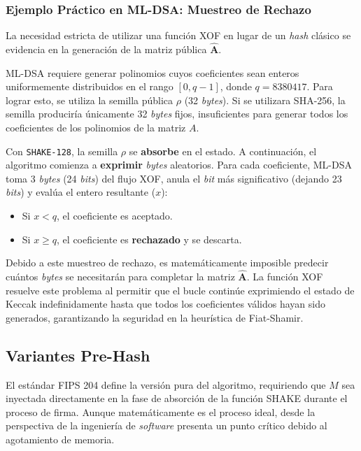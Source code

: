 \documentclass[11pt, a4paper]{report}
\theoremstyle{definition}
\begin{document}
\subsubsection{Ejemplo Práctico en ML-DSA: Muestreo de Rechazo}

La necesidad estricta de utilizar una función XOF en lugar de un \textit{hash} clásico se evidencia en la generación de la matriz pública $\mathbf{\hat{A}}$. 

ML-DSA requiere generar polinomios cuyos coeficientes sean enteros uniformemente distribuidos en el rango $[0, q-1]$, donde $q = 8380417$. Para lograr esto, se utiliza la semilla pública $\rho$ (32 \textit{bytes}). Si se utilizara SHA-256, la semilla produciría únicamente 32 \textit{bytes} fijos, insuficientes para generar todos los coeficientes de los polinomios de la matriz $A$.

Con \texttt{SHAKE-128}, la semilla $\rho$ se \textbf{absorbe} en el estado. A continuación, el algoritmo comienza a \textbf{exprimir} \textit{bytes} aleatorios. Para cada coeficiente, ML-DSA toma 3 \textit{bytes} (24 \textit{bits}) del flujo XOF, anula el \textit{bit} más significativo (dejando 23 \textit{bits}) y evalúa el entero resultante ($x$):
\begin{itemize}
    \item Si $x < q$, el coeficiente es aceptado.
    \item Si $x \ge q$, el coeficiente es \textbf{rechazado} y se descarta.
\end{itemize}
Debido a este muestreo de rechazo, es matemáticamente imposible predecir cuántos \textit{bytes} se necesitarán para completar la matriz $\mathbf{\hat{A}}$. La función XOF resuelve este problema al permitir que el bucle continúe exprimiendo el estado de Keccak indefinidamente hasta que todos los coeficientes válidos hayan sido generados, garantizando la seguridad en la heurística de Fiat-Shamir.

\subsection{Variantes Pre-Hash}
\label{subsec:prehash_oids}

El estándar FIPS 204 define la versión pura del algoritmo, requiriendo que $M$ sea inyectada directamente en la fase de absorción de la función SHAKE durante el proceso de firma. Aunque matemáticamente es el proceso ideal, desde la perspectiva de la ingeniería de \textit{software} presenta un punto crítico debido al agotamiento de memoria.
\end{document}
